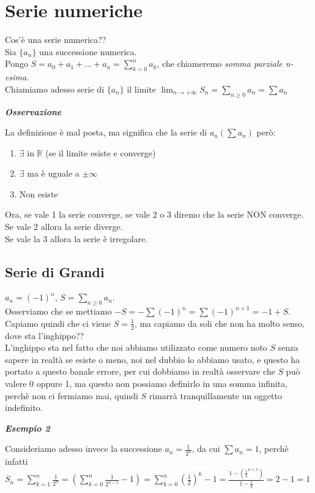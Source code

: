 \documentclass{article}
\theoremstyle{definition}
\newcommand{\R}{\mathbb{R}}
\begin{document}
\newpage
\section{Serie numeriche}
Cos'è una serie numerica??
\\
Sia $\{a_n\}$ una successione numerica.
\\
Pongo $S=a_0+a_1+...+a_n=\sum_{k=0}^na_k$, che chiameremo \textit{somma parziale n-esima}.
\\
Chiamiamo adesso serie di $\{a_n\}$ il limite $\lim_{n \to +\infty}S_n=\sum_{n \geqslant 0}a_n=\sum a_n$
\\
\begin{center}
    \textbf{\textit{Osservazione}}
\end{center}
La definizione è mal posta, ma significa che la serie di $a_n (\sum a_n)$ però:
\begin{enumerate}
    \item $\exists$ in $\R$ (se il limite esiste e converge)
    \item $\exists$ ma è uguale a $\pm \infty$
    \item Non esiste
\end{enumerate}
Ora, se vale 1 la serie converge, se vale 2 o 3 diremo che la serie NON converge.
\\
Se vale 2 allora la serie diverge.
\\
Se vale la 3 allora la serie è irregolare.

\subsection{Serie di Grandi}
$a_n=(-1)^n$, $S=\sum_{n \geqslant 0}a_n$.
\\
Osserviamo che se mettiamo $-S=-\sum (-1)^n= \sum (-1)^{n+1}=-1+S$.
\\
Capiamo quindi che ci viene $S=\frac{1}{2}$, ma capiamo da soli che non ha molto senso, dove sta l'inghippo??
\\
L'inghippo sta nel fatto che noi abbiamo utilizzato come numero noto $S$ senza sapere in realtà se esiste o meno, noi nel dubbio lo abbiamo usato, e questo ha portato a questo banale errore, per cui dobbiamo in realtà osservare che $S$ può valere 0 oppure 1, ma questo non possiamo definirlo in una somma infinita, perchè non ci fermiamo mai, quindi $S$ rimarrà tranquillamente un oggetto indefinito.
\begin{center}
    \textbf{\textit{Esempio 2}}
\end{center}
Consideriamo adesso invece la successione $a_n=\frac{1}{2^n}$, da cui $\sum a_n=1$, perchè infatti $S_n=\sum_{k=1}^n \frac{1}{2^n}=\left(\sum_{k=0}^n \frac{1}{2^{n-1}}- 1\right)=\sum_{k=0}^n (\frac{1}{2})^k-1=\frac{1-(\frac{1}{2}^{n+1})}{1-\frac{1}{2}}= 2-1 = 1$
\end{document}
